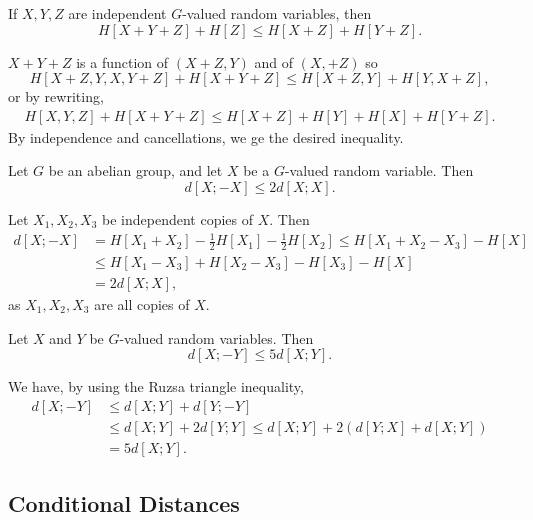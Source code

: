 \documentclass[12pt]{article}
\begin{document}
\begin{lemma}
	If $X, Y, Z$ are independent $G$-valued random variables, then
	\[
		H[X + Y + Z] + H[Z] \leq H[X + Z] + H[Y + Z].
	\]
\end{lemma}

\begin{proofbox}
	$X + Y + Z$ is a function of $(X + Z, Y)$ and of $(X,  + Z)$ so
	\[
		H[X + Z, Y, X, Y + Z] + H[X + Y + Z] \leq H[X + Z, Y] + H[Y, X + Z],
	\]
	or by rewriting,
	\begin{align*}
		H[X, Y, Z] + H[X + Y + Z] \leq H[X + Z] + H[Y] + H[X] + H[Y + Z].
	\end{align*}
	By independence and cancellations, we ge the desired inequality.
\end{proofbox}


\begin{lemma}
	Let $G$ be an abelian group, and let $X$ be a $G$-valued random variable. Then
	\[
		d[X; -X] \leq 2d [X; X].
	\]
\end{lemma}

\begin{proofbox}
	Let $X_1, X_2, X_3$ be independent copies of $X$. Then
	\begin{align*}
		d[X; -X] &= H[X_1 + X_2] - \frac 12 H[X_1] - \frac 12 H[X_2] \leq H[X_1 + X_2 - X_3] - H[X] \\
			 &\leq H[X_1 - X_3] + H[X_2 - X_3] - H[X_3] - H[X] \\
			 &= 2 d[X; X],
	\end{align*}
	as $X_1, X_2, X_3$ are all copies of $X$.
\end{proofbox}

\begin{corollary}
	Let $X$ and $Y$ be $G$-valued random variables. Then
	\[
		d[X; -Y] \leq 5 d[X; Y].
	\]
\end{corollary}

\begin{proofbox}
	We have, by using the Ruzsa triangle inequality,
	\begin{align*}
		d[X; -Y] &\leq d[X; Y] + d[Y; -Y] \\
			 &\leq d[X; Y] + 2d[Y; Y] \leq d[X; Y] + 2 (d[Y; X] + d[X; Y]) \\
			 &= 5 d[X; Y].
	\end{align*}
\end{proofbox}

\subsection{Conditional Distances}%
\label{sub:cds}
\end{document}
